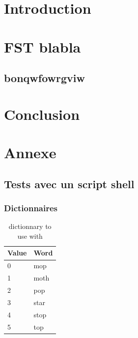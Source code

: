 



\maketitle

\newpage
\clearpage
{}
\setcounter{page}{1}
\footercenter{\textbf{\thepage}}

\hypertarget{Contents}{}
\tableofcontents
\newpage
\lstlistoflistings
\newpage
\listoftables

\newpage
\clearpage
{}
\setcounter{page}{1}

\section*{Introduction}

\newpage
\section{FST blabla}

\subsection{bonqwfowrgviw}

\newpage
\section*{Conclusion}

\newpage
\appendix
\section{Annexe}

\subsection{Tests avec un script shell}

\subsubsection{Dictionnaires}

\begin{table}[h]
    \centering
    \begin{tabular}{|l|l|}
        \hline
        Value & Word \\
        \hline
        0 & mop \\
        1 & moth \\
        2 & pop \\
        3 & star \\
        4 & stop \\
        5 & top \\
        \hline
    \end{tabular}
    \caption{dictionnary to use with }
\end{table}

